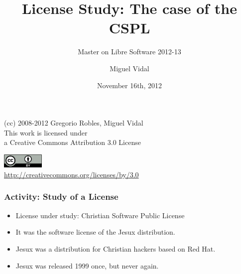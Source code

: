\documentclass{beamer}
\begin{document}
\title{License Study: The case of the CSPL}
\subtitle{Master on Libre Software 2012-13}
\author{Miguel Vidal} 
\date{November 16th, 2012}


\begin{frame}
  \vspace{2cm}
  \begin{flushright}
    {\small (cc) 2008-2012 Gregorio Robles, Miguel Vidal} \\
    \medskip
    {\scriptsize This work is licensed under \\ a Creative Commons Attribution 3.0 License}
  \end{flushright}
  \begin{flushright}
    \href{http://creativecommons.org/licenses/by/3.0/es}{\includegraphics[width=2cm]{format/cc-by.png}} \\
    {\tiny \url{http://creativecommons.org/licenses/by/3.0}}
  \end{flushright}
\end{frame}%

\usebackgroundtemplate{}



\begin{frame}
\frametitle{Activity: Study of a License}

\begin{itemize}
\item License under study: Christian Software Public License
\item It was the software license of the Jesux distribution.
\item Jesux was a distribution for Christian hackers based on Red Hat.
\item Jesux was released 1999 once, but never again.
\end{itemize}

\end{frame}
\end{document}
